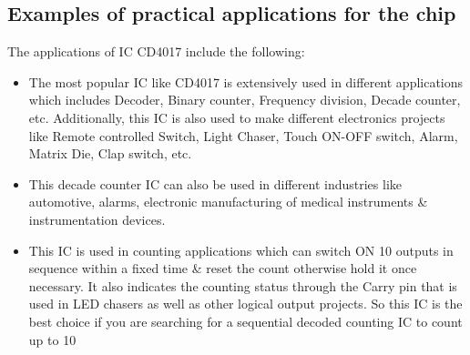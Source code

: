 \documentclass[pstricks,border=11pt]{article}
\begin{document}
\subsection{Examples of practical applications for the chip}
The applications of IC CD4017 include the following:
\begin{itemize}
    \item The most popular IC like CD4017 is extensively used in different applications which includes Decoder, Binary counter, Frequency division, Decade counter, etc. Additionally, this IC is also used to make different electronics projects like Remote controlled Switch, Light Chaser, Touch ON-OFF switch, Alarm, Matrix Die, Clap switch, etc.
    \item This decade counter IC can also be used in different industries like automotive, alarms, electronic manufacturing of medical instruments \& instrumentation devices.
    \item This IC is used in counting applications which can switch ON 10 outputs in sequence within a fixed time \& reset the count otherwise hold it once necessary. It also indicates the counting status through the Carry pin that is used in LED chasers as well as other logical output projects. So this IC is the best choice if you are searching for a sequential decoded counting IC to count up to 10
\end{itemize}

\hfill \break
\end{document}
